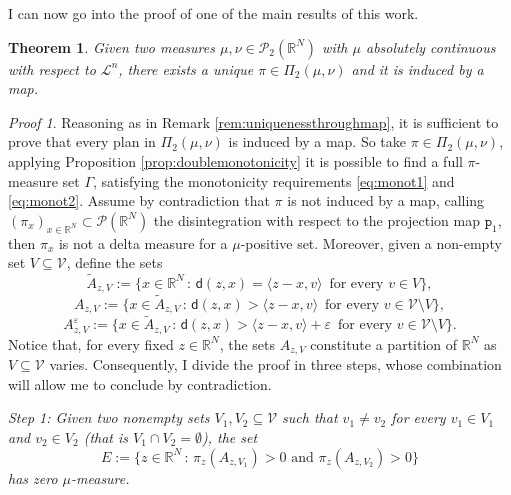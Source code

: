 \documentclass[11pt,twoside,a4paper]{article}
\newcommand{\scal}[2]{\ensuremath{\langle #1 , #2 \rangle}} %
\newcommand{\Leb}{\mathscr{L}}
\newcommand{\R}{\mathbb{R}}
\newcommand{\p}{\mathtt p} %
\newcommand{\suchthat}{\ensuremath{\,:\,}} %
\newcommand{\thmsymbol}{\( \square \)}
\newcommand{\di}{\mathsf d} %
\newcommand{\Prob}{\mathscr{P}}
\newcommand{\ProbTwo}{\mathscr{P}_2}
\theoremstyle{theorem}
\newtheorem{theorem}{Theorem}[section]
\theoremstyle{definition}
\theoremstyle{remark}
\theoremstyle{proof}
\newtheorem*{pro}{Proof}
\newenvironment{pr}{\begin{pro}%
 \renewcommand{\qedsymbol}{\thmsymbol}\pushQED{\qed}}%
 {\popQED\end{pro}}
\begin{document}
\noindent I can now go into the proof of one of the main results of this work.


\begin{theorem}\label{thm:crystalline}
Given two measures $\mu,\nu\in \ProbTwo(\R^N)$ with $\mu$ absolutely continuous with respect to $\Leb^n$, there exists a unique $\pi\in \Pi_2(\mu,\nu)$ and it is induced by a map. 
\end{theorem}

\begin{pr}
Reasoning as in Remark \ref{rem:uniquenessthroughmap}, it is sufficient to prove that every plan in $\Pi_2(\mu,\nu)$ is induced by a map.
So take $\pi\in \Pi_2(\mu,\nu)$, applying Proposition \ref{prop:doublemonotonicity} it is possible to find a full $\pi$-measure set $\Gamma$, satisfying the monotonicity requirements \eqref{eq:monot1} and \eqref{eq:monot2}. Assume by contradiction that $\pi$ is not induced by a map, calling $(\pi_x)_{x\in \R^N}\subset \Prob(\R^N)$ the disintegration with respect to the projection map $\p_1$, then $\pi_x$ is not a delta measure for a $\mu$-positive set. Moreover, given a non-empty set $V \subseteq \mathcal V$, define the sets
\begin{equation*}
     \tilde A_{z,V}:= \big\{x\in \R^N \suchthat \di(z,x)=\scal{z-x}{v}\,\,\, \text{for every } v \in V\big\},
\end{equation*}
\begin{equation*}
    A_{z,V} := \big\{x \in\tilde A_{z,V} \suchthat \di(z,x)>\scal{z-x}{v}\,\,\, \text{for every } v \in\mathcal V \setminus V \big\},
\end{equation*}
\begin{equation*}
    A_{z,V}^\varepsilon := \big\{x \in\tilde A_{z,V} \suchthat \di(z,x)>\scal{z-x}{v} + \varepsilon\,\,\, \text{for every } v \in\mathcal V \setminus V \big\}.
\end{equation*}
Notice that, for every fixed $z\in\R^N$, the sets $A_{z,V}$ constitute a partition of $\R^N$ as $V\subseteq \mathcal V$ varies.
Consequently, I divide the proof in three steps, whose combination will allow me to conclude by contradiction.

\noindent \textit{Step 1: Given two nonempty sets $V_1, V_2 \subseteq \mathcal V$ such that $v_1\ne v_2$ for every $v_1\in V_1$ and $v_2\in V_2$ (that is $V_1 \cap V_2=\emptyset$), the set
\begin{equation*}
    E:= \big\{z\in \R^N \suchthat \pi_z(A_{z,V_1})>0 \text{ and } \pi_z(A_{z,V_2})>0 \big\}
\end{equation*}
has zero $\mu$-measure.}


\end{pr}
\end{document}
